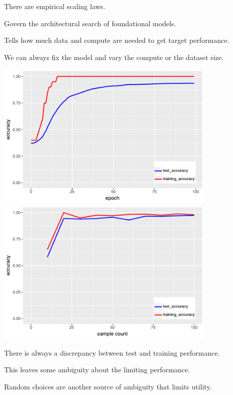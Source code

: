 \documentclass[landscape,footrule]{foils}
\begin{document}
\vspace*{1cm}

There are empirical scaling laws.
\begin{diamonds}
\item Govern  the architectural search of foundational  models.
\item Tells how much data and compute are needed to get target performance.
\end{diamonds}


We can always fix the model and vary the compute or the dataset size.  

\vspace{1cm}
\centerline{\includegraphics[height=7cm]{scaling-law-i}\hspace{1cm} \includegraphics[height=7cm]{scaling-law-ii}}

There is always a discrepancy between test and training performance.
\begin{triangles}
\item This leaves some ambiguity about the limiting  performance.
\item Random choices are another source of ambiguity that limits utility.
\end{triangles}
\end{document}

